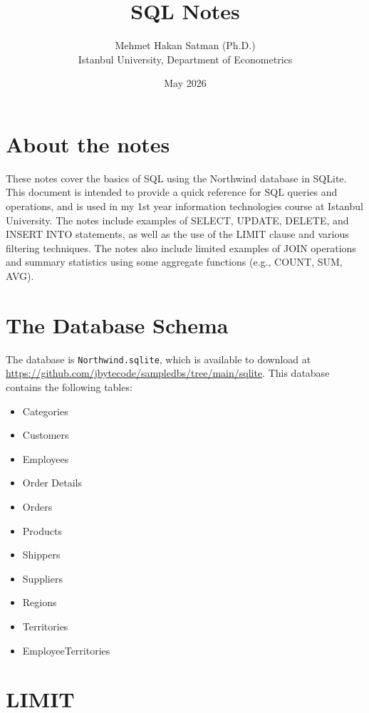 \documentclass[10pt]{article}
\begin{document}
\title{SQL Notes}
\author{Mehmet Hakan Satman (Ph.D.)\\Istanbul University, Department of Econometrics}
\date{May 2026}

\maketitle

\tableofcontents

\section{About the notes}

These notes cover the basics of SQL using the Northwind database in SQLite.
This document is intended to provide a quick reference for SQL queries and operations, 
and is used in my 1st year information technologies course at Istanbul University. 
The notes include examples of SELECT, UPDATE, DELETE, and INSERT INTO statements, 
as well as the use of the LIMIT clause and various filtering techniques.
The notes also include limited examples of JOIN operations and summary statistics using some 
aggregate functions (e.g., COUNT, SUM, AVG).


\section{The Database Schema}

The database is \texttt{Northwind.sqlite}, which is available to download at 
\url{https://github.com/jbytecode/sampledbs/tree/main/sqlite}. This database contains 
the following tables:

\begin{itemize}
    \item Categories
    \item Customers
    \item Employees
    \item Order Details
    \item Orders
    \item Products
    \item Shippers
    \item Suppliers
    \item Regions
    \item Territories
    \item EmployeeTerritories
\end{itemize}


\section{LIMIT}
\end{document}
